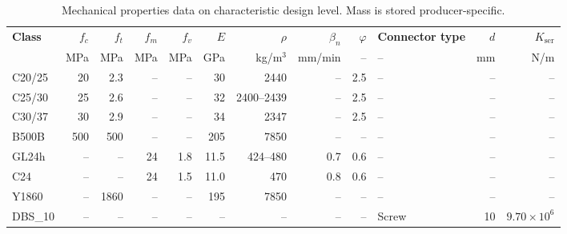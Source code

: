 \begin{table}[h]
    \centering
    \begingroup
    \scriptsize
    \caption{Mechanical properties data on characteristic design level. Mass is stored producer-specific.}
    \label{tab:material_properties}
    \setlength{\tabcolsep}{3pt}
    \renewcommand{\arraystretch}{1.15}
    \begin{tabularx}{\textwidth}{@{}>{\raggedright\arraybackslash}X|r|r|r|r|r|r|r|r|>{\raggedright\arraybackslash}X|r|r@{}}
  \hline
    \textbf{Class} &
    \textbf{$f_c$} &
    \textbf{$f_t$} &
    \textbf{$f_m$} &
    \textbf{$f_v$} &
    \textbf{$E$} &
    \textbf{$\rho$} &
    \textbf{$\beta_n$} &
    \textbf{$\varphi$} &
    \textbf{Connector type} &
    \textbf{$d$} &
    \textbf{$K_{\mathrm{ser}}$} \\
    &
    MPa &
    MPa &
    MPa &
    MPa &
    GPa &
    kg/m$^3$ &
    mm/min &
    -- &
    -- &
    mm &
    N/m \\
    \hline

    C20/25 &
    20 &
    2.3 &
    -- &
    -- &
    30 &
    2440 &
    -- &
    2.5 &
    -- &
    -- &
    -- \\

    C25/30 &
    25 &
    2.6 &
    -- &
    -- &
    32 &
    2400--2439 &
    -- &
    2.5 &
    -- &
    -- &
    -- \\

    C30/37 &
    30 &
    2.9 &
    -- &
    -- &
    34 &
    2347 &
    -- &
    2.5 &
    -- &
    -- &
    -- \\

    B500B &
    500 &
    500 &
    -- &
    -- &
    205 &
    7850 &
    -- &
    -- &
    -- &
    -- &
    -- \\

    GL24h &
    -- &
    -- &
    24 &
    1.8 &
    11.5 &
    424--480 &
    0.7 &
    0.6 &
    -- &
    -- &
    -- \\

    C24 &
    -- &
    -- &
    24 &
    1.5 &
    11.0 &
    470 &
    0.8 &
    0.6 &
    -- &
    -- &
    -- \\

    Y1860 &
    -- &
    1860 &
    -- &
    -- &
    195 &
    7850 &
    -- &
    -- &
    -- &
    -- &
    -- \\

    DBS\_10 &
    -- &
    -- &
    -- &
    -- &
    -- &
    -- &
    -- &
    -- &
    Screw &
    10 &
    $9.70 \times 10^6$ \\


\end{tabularx}
\end{table}
